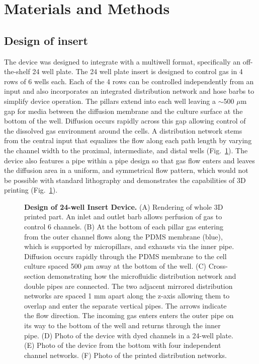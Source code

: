 \documentclass[10pt,letterpaper]{article}
\begin{document}
\section*{Materials and Methods}
\subsection*{Design of insert}

The device was designed to integrate with a multiwell format, specifically an off-the-shelf 24 well plate. 
The 24 well plate insert is designed to control gas in 4 rows of 6 wells each. 
Each of the 4 rows can be controlled independently from an input and also incorporates an integrated distribution network and hose barbs to simplify device operation.
The pillars extend into each well leaving a $\sim$500 $\mu$m gap for media between the diffusion membrane and the culture surface at the bottom of the well.
Diffusion occurs rapidly across this gap allowing control of the dissolved gas environment around the cells. 
A distribution network stems from the central input that equalizes the flow along each path length by varying the channel width to the proximal, intermediate, and distal wells (Fig.~\ref{fig1}).
The device also features a pipe within a pipe design so that gas flow enters and leaves the diffusion area in a uniform, and symmetrical flow pattern, which would not be possible with standard lithography and demonstrates the capabilities of 3D printing (Fig.~\ref{fig1}).


\begin{figure}[h]
\caption{
{\bf Design of 24-well Insert Device.}
(A) Rendering of whole 3D printed part.
An inlet and outlet barb allows perfusion of gas to control 6 channels.
(B) At the bottom of each pillar gas entering from the outer channel flows along the PDMS membrane (blue), which is supported by micropillars, and exhausts via the inner pipe.
Diffusion occurs rapidly through the PDMS membrane to the cell culture spaced 500 $\mu$m away at the bottom of the well.
(C) Cross-section demonstrating how the microfluidic distribution network and double pipes are connected. 
The two adjacent mirrored distribution networks are spaced 1 mm apart along the z-axis allowing them to overlap and enter the separate vertical pipes.
The arrows indicate the flow direction.
The incoming gas enters enters the outer pipe on its way to the bottom of the well and returns through the inner pipe.
(D) Photo of the device with dyed channels in a 24-well plate.
(E) Photo of the device from the bottom with four independent channel networks.
(F) Photo of the printed distribution networks.
}
\label{fig1}
\end{figure}
\end{document}
